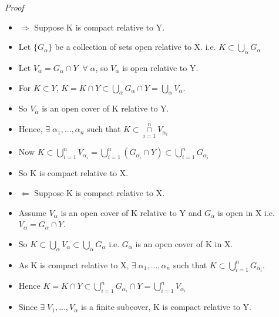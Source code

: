 \documentclass[12pt]{article}
\begin{document}
\vspace{1.0\baselineskip}
\begin{block}{\sl Proof} 
\begin{itemize}
    \item $\Rightarrow$ Suppose K is compact relative to Y.
    \item Let $\{G_\alpha\}$ be a collection of sets open relative to X. \;\;i.e. $K\subset \bigcup\limits_\alpha G_\alpha$
    \item Let $V_\alpha = G_\alpha \cap Y\;\; \forall\;\alpha$, so $V_\alpha$ is open relative to Y.
    \item For $K\subset Y$, $K=K \cap Y \subset \bigcup\limits_\alpha G_\alpha \cap Y = \bigcup\limits_\alpha V_\alpha$.
    \item So $V_\alpha$ is an open cover of K relative to Y.
    \item Hence, $\exists\; \alpha_1,...,\alpha_n$ such that $K\subset \cap\limits_{i=1}^n V_{\alpha_i}$
    \item Now $K\subset \bigcup\limits_{i=1}^n V_{\alpha_i} = 
    \bigcup\limits_{i=1}^n (G_{\alpha_i} \cap Y) \subset 
    \bigcup\limits_{i=1}^n G_{\alpha_i}$
    \item So K is compact relative to X.\\
    
    \item $\Leftarrow$ Suppose K is compact relative to X.
    \item Assume $V_\alpha$ is an open cover of K relative to Y and $G_\alpha$ is open in X \;\; i.e. $V_\alpha = G_\alpha \cap Y$.
    \item So $K\subset \bigcup\limits_\alpha V_\alpha \subset \bigcup\limits_\alpha G_\alpha$\;\; i.e. $G_\alpha$ is an open cover of K in X.
    \item As K is compact relative to X, $\exists\;\alpha_1,...,\alpha_n$ such that $K\subset \bigcup\limits_{i=1}^n G_{\alpha_i}$. \item Hence $K = K\cap Y \subset \bigcup\limits_{i=1}^n G_{\alpha_i} \cap Y = \bigcup\limits_{i=1}^n V_{\alpha_i}$ 
    \item Since $\exists\; V_{1},...,V_{\alpha}$ is a finite subcover, K is compact relative to Y.
\end{itemize}
\end{block}
\end{document}
